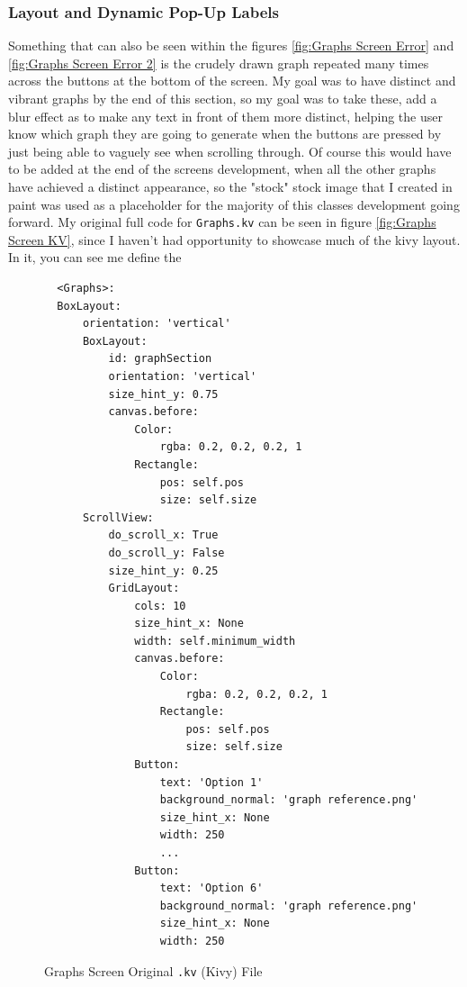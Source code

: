 \documentclass{article}
\begin{document}
\subsubsection{Layout and Dynamic Pop-Up Labels}
Something that can also be seen within the figures \ref{fig:Graphs Screen Error} and \ref{fig:Graphs Screen Error 2} is the crudely drawn graph repeated many times across the buttons at the bottom of the screen. My goal was to have distinct and vibrant graphs by the end of this section, so my goal was to take these, add a blur effect as to make any text in front of them more distinct, helping the user know which graph they are going to generate when the buttons are pressed by just being able to vaguely see when scrolling through. Of course this would have to be added at the end of the screens development, when all the other graphs have achieved a distinct appearance, so the "stock" stock image that I created in paint was used as a placeholder for the majority of this classes development going forward. My original full code for \texttt{Graphs.kv} can be seen in figure \ref{fig:Graphs Screen KV}, since I haven't had opportunity to showcase much of the kivy layout. In it, you can see me define the\\\vspace{0.3cm}

\begin{figure}
\begin{verbatim}
  <Graphs>:
  BoxLayout:
      orientation: 'vertical'
      BoxLayout:
          id: graphSection
          orientation: 'vertical'
          size_hint_y: 0.75
          canvas.before:
              Color:
                  rgba: 0.2, 0.2, 0.2, 1
              Rectangle:
                  pos: self.pos
                  size: self.size
      ScrollView:
          do_scroll_x: True
          do_scroll_y: False
          size_hint_y: 0.25
          GridLayout:
              cols: 10
              size_hint_x: None
              width: self.minimum_width
              canvas.before:
                  Color:
                      rgba: 0.2, 0.2, 0.2, 1
                  Rectangle:
                      pos: self.pos
                      size: self.size
              Button:
                  text: 'Option 1'
                  background_normal: 'graph reference.png'
                  size_hint_x: None
                  width: 250 
                  ...
              Button:
                  text: 'Option 6'
                  background_normal: 'graph reference.png'
                  size_hint_x: None
                  width: 250
\end{verbatim}
\caption{Graphs Screen Original \texttt{.kv} (Kivy) File}\label{fig:Graphs Screen .kv}
\end{figure}
\end{document}
